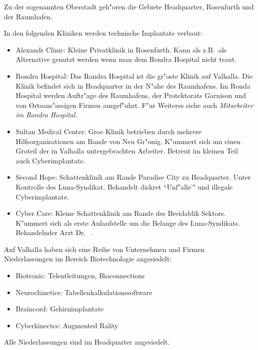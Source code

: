 Zu der sogenannten Oberstadt geh"oren die Gebiete Headquarter, Rosenfurth und der Raumhafen.



In den folgenden Kliniken werden technische Implantate verbaut:

\begin{itemize}
    \item Alexandr Clinic: Kleine Privatklinik in Rosenfurth. Kann als z.B.~als Alternative genutzt werden wenn man dem Rondra Hospital nicht traut.
    \item Rondra Hospital: Das Rondra Hospital ist die gr"os\3te Klinik auf Valhalla. Die Klinik befindet sich in Headquarter in der N"ahe des Raumhafens. Im Ronda Hospital werden Auftr"age des Raumhafens, der Protektorats Garnison und von Ortsans"assigen Firmen ausgef"uhrt. F"ur Weiteres siehe auch \emph{Mitarbeiter im Rondra Hospital}. 
    \item Sultan Medical Center: Gro\3e Klinik betrieben durch mehrere Hilfsorganisationen am Rande von Neu Gr"onig. K"ummert sich um einen Gro\3teil der in Valhalla untergebrachten Arbeiter. Betreut im kleinen Teil auch Cyberimplantate.
    \item Second Hope: Schattenklinik am Rande Paradise City zu Headquarter. Unter Kontrolle des Luna-Syndikat. Behandelt diskret ``Unf"alle'" und illegale Cyberimplantate.
    \item {} Cyber Care: Kleine Schattenklinik am Rande des Breidablik Sektors. K"ummert sich als erste Anlaufstelle um die Belange des Luna-Syndikats. Behandelnder Arzt Dr.~ .
\end{itemize}


Auf Valhalla haben sich eine Reihe von Unternehmen und Firmen Niederlassungen im Bereich Biotechnologie angesiedelt:

\begin{itemize}
    \item Biotronic: Telentleitungen, Bioconnections
    \item Neurochinetics: Tabellenkalkulationssoftware
    \item Braincord: Gehirnimplantate
    \item Cyberkinectcs: Augmented Rality
\end{itemize}

Alle Niederlassungen sind im Headquarter angesiedelt.

